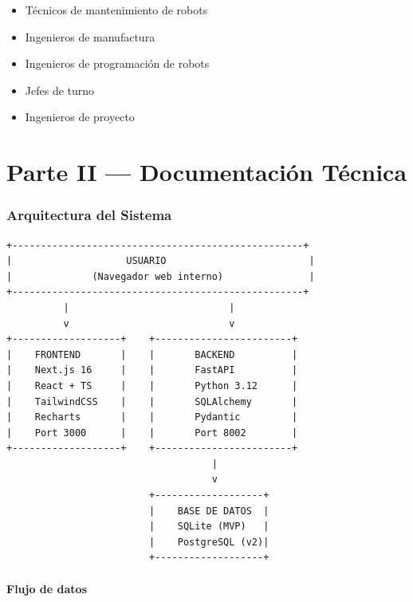 \documentclass[11pt,a4paper]{article}
\begin{document}
\begin{itemize}[noitemsep]
    \item Técnicos de mantenimiento de robots
    \item Ingenieros de manufactura
    \item Ingenieros de programación de robots
    \item Jefes de turno
    \item Ingenieros de proyecto
\end{itemize}

\newpage


\part*{Parte II --- Documentación Técnica}

\section{Arquitectura del Sistema}

\begin{lstlisting}
+---------------------------------------------------+
|                    USUARIO                         |
|              (Navegador web interno)               |
+---------------------------------------------------+
          |                            |
          v                            v
+-------------------+    +------------------------+
|    FRONTEND       |    |       BACKEND          |
|    Next.js 16     |    |       FastAPI          |
|    React + TS     |    |       Python 3.12      |
|    TailwindCSS    |    |       SQLAlchemy       |
|    Recharts       |    |       Pydantic         |
|    Port 3000      |    |       Port 8002        |
+-------------------+    +------------------------+
                                    |
                                    v
                         +-------------------+
                         |    BASE DE DATOS  |
                         |    SQLite (MVP)   |
                         |    PostgreSQL (v2)|
                         +-------------------+
\end{lstlisting}

\subsection{Flujo de datos}
\end{document}
